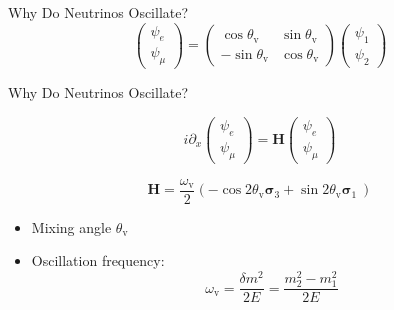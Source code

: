 \documentclass[9pt]{beamer}
\begin{document}
\begin{darkframes}
\begin{frame}{Why Do Neutrinos Oscillate?}
\begin{equation*}
\begin{pmatrix}
\psi_e\\
\psi_\mu
\end{pmatrix} = \begin{pmatrix}
\cos \theta_{\mathrm v} & \sin\theta_{\mathrm v} \\
-\sin \theta_{\mathrm v} & \cos \theta_{\mathrm v}
\end{pmatrix}\begin{pmatrix}
\psi_1\\
\psi_2
\end{pmatrix}
\end{equation*}

\end{frame}



\begin{frame}[fragile]{Why Do Neutrinos Oscillate?}





\begin{tcolorbox}[title=Equation of Motion, standard jigsaw, opacityback=0, coltext=white]

\begin{equation*}
i\partial_x \begin{pmatrix}
\psi_e\\
\psi_\mu
\end{pmatrix} = \mathbf{H}\begin{pmatrix}
\psi_e\\
\psi_\mu
\end{pmatrix}
\end{equation*}

\end{tcolorbox}

\pause

\begin{tcolorbox}[standard jigsaw, opacityback=0,coltext=white]
\begin{equation*}
\mathbf{H} = \frac{\omega_{\mathrm v} }{2}\left( - \cos 2\theta_{\mathrm v } \boldsymbol{\sigma}_3  + \sin 2\theta_{\mathrm{v}} \boldsymbol{\sigma}_1\ \right)
\end{equation*}


\begin{itemize}
   \item  Mixing angle $\theta_{\mathrm v}$
    \item  Oscillation frequency:
\begin{equation*}
    \omega_{\mathrm v} = \frac{\delta m^2}{2E}=\frac{m_2^2 - m_1^2}{2E}
\end{equation*}


\end{itemize}
\end{tcolorbox}
\end{frame}
\end{darkframes}
\end{document}
